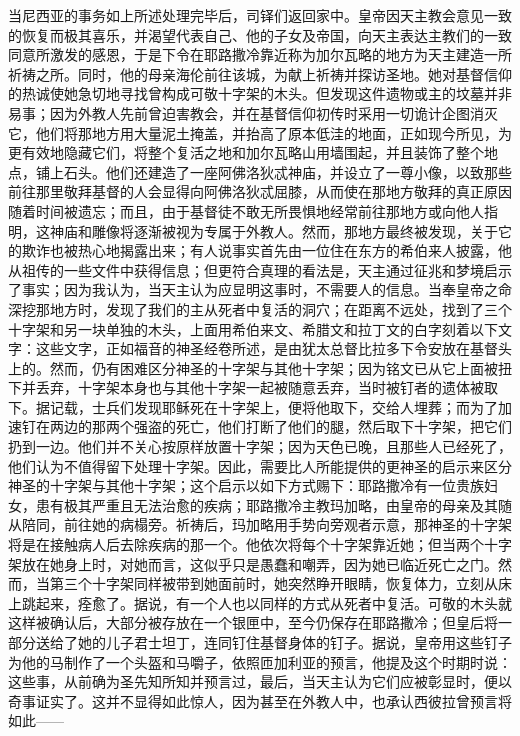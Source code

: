 当尼西亚的事务如上所述处理完毕后，司铎们返回家中。皇帝因天主教会意见一致的恢复而极其喜乐，并渴望代表自己、他的子女及帝国，向天主表达主教们的一致同意所激发的感恩，于是下令在耶路撒冷靠近称为加尔瓦略的地方为天主建造一所祈祷之所。同时，他的母亲海伦前往该城，为献上祈祷并探访圣地。她对基督信仰的热诚使她急切地寻找曾构成可敬十字架的木头。但发现这件遗物或主的坟墓并非易事；因为外教人先前曾迫害教会，并在基督信仰初传时采用一切诡计企图消灭它，他们将那地方用大量泥土掩盖，并抬高了原本低洼的地面，正如现今所见，为更有效地隐藏它们，将整个复活之地和加尔瓦略山用墙围起，并且装饰了整个地点，铺上石头。他们还建造了一座阿佛洛狄忒神庙，并设立了一尊小像，以致那些前往那里敬拜基督的人会显得向阿佛洛狄忒屈膝，从而使在那地方敬拜的真正原因随着时间被遗忘；而且，由于基督徒不敢无所畏惧地经常前往那地方或向他人指明，这神庙和雕像将逐渐被视为专属于外教人。然而，那地方最终被发现，关于它的欺诈也被热心地揭露出来；有人说事实首先由一位住在东方的希伯来人披露，他从祖传的一些文件中获得信息；但更符合真理的看法是，天主通过征兆和梦境启示了事实；因为我认为，当天主认为应显明这事时，不需要人的信息。当奉皇帝之命深挖那地方时，发现了我们的主从死者中复活的洞穴；在距离不远处，找到了三个十字架和另一块单独的木头，上面用希伯来文、希腊文和拉丁文的白字刻着以下文字：这些文字，正如福音的神圣经卷所述，是由犹太总督比拉多下令安放在基督头上的。然而，仍有困难区分神圣的十字架与其他十字架；因为铭文已从它上面被扭下并丢弃，十字架本身也与其他十字架一起被随意丢弃，当时被钉者的遗体被取下。据记载，士兵们发现耶稣死在十字架上，便将他取下，交给人埋葬；而为了加速钉在两边的那两个强盗的死亡，他们打断了他们的腿，然后取下十字架，把它们扔到一边。他们并不关心按原样放置十字架；因为天色已晚，且那些人已经死了，他们认为不值得留下处理十字架。因此，需要比人所能提供的更神圣的启示来区分神圣的十字架与其他十字架；这个启示以如下方式赐下：耶路撒冷有一位贵族妇女，患有极其严重且无法治愈的疾病；耶路撒冷主教玛加略，由皇帝的母亲及其随从陪同，前往她的病榻旁。祈祷后，玛加略用手势向旁观者示意，那神圣的十字架将是在接触病人后去除疾病的那一个。他依次将每个十字架靠近她；但当两个十字架放在她身上时，对她而言，这似乎只是愚蠢和嘲弄，因为她已临近死亡之门。然而，当第三个十字架同样被带到她面前时，她突然睁开眼睛，恢复体力，立刻从床上跳起来，痊愈了。据说，有一个人也以同样的方式从死者中复活。可敬的木头就这样被确认后，大部分被存放在一个银匣中，至今仍保存在耶路撒冷；但皇后将一部分送给了她的儿子君士坦丁，连同钉住基督身体的钉子。据说，皇帝用这些钉子为他的马制作了一个头盔和马嚼子，依照匝加利亚的预言，他提及这个时期时说：这些事，从前确为圣先知所知并预言过，最后，当天主认为它们应被彰显时，便以奇事证实了。这并不显得如此惊人，因为甚至在外教人中，也承认西彼拉曾预言将如此——\par

